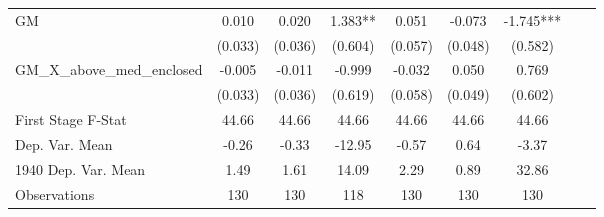 \begin{tabular}{l*{8}{c}}
\cmidrule(lr){1-7}
GM              &    0.010   &    0.020   &    1.383** &    0.051   &   -0.073   &   -1.745***\\
                &  (0.033)   &  (0.036)   &  (0.604)   &  (0.057)   &  (0.048)   &  (0.582)   \\
\addlinespace
GM\_X\_above\_med\_enclosed&   -0.005   &   -0.011   &   -0.999   &   -0.032   &    0.050   &    0.769   \\
                &  (0.033)   &  (0.036)   &  (0.619)   &  (0.058)   &  (0.049)   &  (0.602)   \\
\midrule
First Stage F-Stat&    44.66   &    44.66   &    44.66   &    44.66   &    44.66   &    44.66   \\
Dep. Var. Mean  &    -0.26   &    -0.33   &   -12.95   &    -0.57   &     0.64   &    -3.37   \\
1940 Dep. Var. Mean&     1.49   &     1.61   &    14.09   &     2.29   &     0.89   &    32.86   \\
Observations    &      130   &      130   &      118   &      130   &      130   &      130   \\
 \bottomrule \end{tabular}
